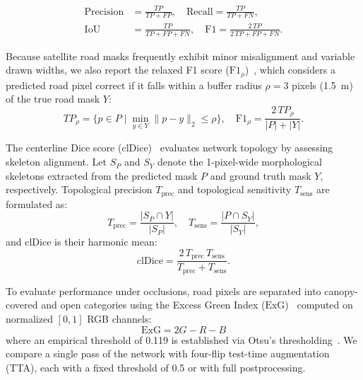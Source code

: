 \documentclass{ieeeaccess}
\begin{document}
\begin{equation}
\begin{split}
\mathrm{Precision} &= \frac{\mathit{TP}}{\mathit{TP} + \mathit{FP}}, \quad \mathrm{Recall} = \frac{\mathit{TP}}{\mathit{TP} + \mathit{FN}},\\
\mathrm{IoU} &= \frac{\mathit{TP}}{\mathit{TP} + \mathit{FP} + \mathit{FN}}, \quad \mathrm{F1} = \frac{2\,\mathit{TP}}{2\,\mathit{TP} + \mathit{FP} + \mathit{FN}}.
\end{split}
\end{equation}

Because satellite road masks frequently exhibit minor misalignment and variable drawn widths, we also report the relaxed F1 score ($\mathrm{F1}_\rho$)~\cite{mnih2010roads}, which considers a predicted road pixel correct if it falls within a buffer radius $\rho = 3$ pixels (1.5~m) of the true road mask $Y$:
\begin{equation}
\mathit{TP}_\rho = \{p \in P \mid \min_{y \in Y} \|p - y\|_2 \le \rho\}, \quad \mathrm{F1}_\rho = \frac{2\,\mathit{TP}_\rho}{|P| + |Y|}.
\end{equation}

The centerline Dice score ($\mathrm{clDice}$)~\cite{shit2021cldice} evaluates network topology by assessing skeleton alignment. Let $S_P$ and $S_Y$ denote the 1-pixel-wide morphological skeletons extracted from the predicted mask $P$ and ground truth mask $Y$, respectively. Topological precision $T_{\mathrm{prec}}$ and topological sensitivity $T_{\mathrm{sens}}$ are formulated as:
\begin{equation}
T_{\mathrm{prec}} = \frac{|S_P \cap Y|}{|S_P|}, \quad T_{\mathrm{sens}} = \frac{|P \cap S_Y|}{|S_Y|},
\end{equation}
and $\mathrm{clDice}$ is their harmonic mean:
\begin{equation}
\mathrm{clDice} = \frac{2\,T_{\mathrm{prec}}\,T_{\mathrm{sens}}}{T_{\mathrm{prec}} + T_{\mathrm{sens}}}.
\end{equation}

To evaluate performance under occlusions, road pixels are separated into canopy-covered and open categories using the Excess Green Index ($\mathrm{ExG}$)~\cite{woebbecke1995excess} computed on normalized $[0, 1]$ RGB channels:
\begin{equation}
\mathrm{ExG} = 2G - R - B
\end{equation}
where an empirical threshold of 0.119 is established via Otsu's thresholding~\cite{otsu1979threshold}. We compare a single pass of the network with four-flip test-time augmentation (TTA), each with a fixed threshold of 0.5 or with full postprocessing.
\end{document}
